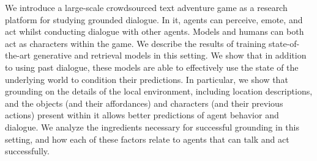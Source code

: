 We introduce a large-scale crowdsourced text adventure game as a research platform for studying grounded dialogue. In it, agents can perceive, emote, and act whilst conducting dialogue with other agents. Models and humans can both act as characters within the game. We describe the results of training state-of-the-art generative and retrieval models in this setting. We show that in addition to using past dialogue, these models are able to effectively use the state of the underlying world to condition their predictions. In particular, we show that  grounding on the details of the local environment, including location descriptions, and the objects (and their affordances) and characters (and their previous actions) present within it allows better predictions of agent behavior and dialogue. We analyze the ingredients necessary for successful grounding in this setting, and how each of these factors relate to agents that can talk and act successfully.